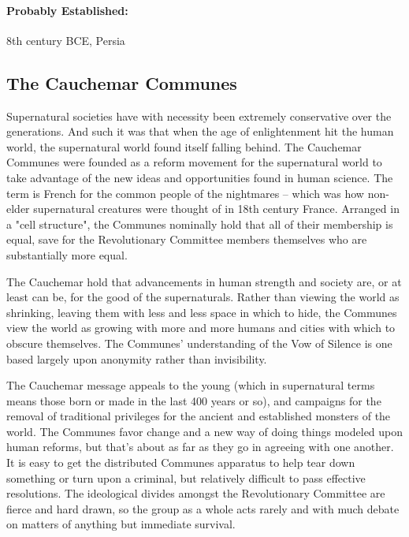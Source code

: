 \paragraph{Probably Established:} 8th century BCE, Persia

\subsection{The Cauchemar Communes} 

Supernatural societies have with necessity been extremely conservative over the generations. And such it was that when the age of enlightenment hit the human world, the supernatural world found itself falling behind. The Cauchemar Communes were founded as a reform movement for the supernatural world to take advantage of the new ideas and opportunities found in human science. The term is French for the common people of the nightmares -- which was how non-elder supernatural creatures were thought of in 18th century France. Arranged in a "cell structure", the Communes nominally hold that all of their membership is equal, save for the Revolutionary Committee members themselves who are substantially more equal.

The Cauchemar hold that advancements in human strength and society are, or at least can be, for the good of the supernaturals. Rather than viewing the world as shrinking, leaving them with less and less space in which to hide, the Communes view the world as growing with more and more humans and cities with which to obscure themselves. The Communes'  understanding of the Vow of Silence is one based largely upon anonymity rather than invisibility.

The Cauchemar message appeals to the young (which in supernatural terms means those born or made in the last 400 years or so), and campaigns for the removal of traditional privileges  for the ancient and established monsters of the world. The Communes favor change and a new way of doing things modeled upon human reforms, but that's about as far as they go in agreeing with one another. It is easy to get the distributed Communes apparatus to help tear down something or turn upon a criminal, but relatively difficult to pass effective resolutions. The ideological divides amongst the Revolutionary Committee are fierce and hard drawn, so the group as a whole acts rarely and with much debate on matters of anything but immediate survival.

